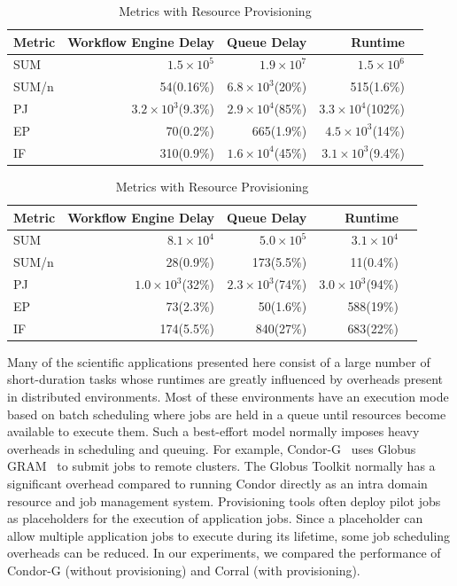 \begin{table}[htb]
	\footnotesize
	\centering
	\begin{tabular}{l|rrrr}
Metric & Workflow Engine Delay  &Queue Delay& Runtime\\
		\hline
		SUM & $1.5\times 10^5$ & $1.9\times 10^7$ &  $1.5\times 10^6$ \\
		SUM/n & 54(0.16\%) & $6.8\times 10^3$(20\%)& 515(1.6\%) \\
		PJ & $3.2\times 10^3$(9.3\%) & $2.9\times 10^4$(85\%) & $3.3\times 10^4$(102\%) \\
		EP & 70(0.2\%) & 665(1.9\%) & $4.5\times 10^3$(14\%) \\
		IF & 310(0.9\%)& $1.6\times 10^4$(45\%) & $3.1\times 10^3$(9.4\%)\\
	\end{tabular}
		\caption{Metrics Without Resource Provisioning}
			\label{tab:profiling_no_provisioning}
	\quad
	\begin{tabular}{l|rrrr}
Metric & Workflow Engine Delay  &Queue Delay& Runtime\\
		\hline
		SUM & $8.1\times 10^4$ & $5.0\times 10^5$ &  $3.1\times 10^4$ \\
		SUM/n & 28(0.9\%) & 173(5.5\%)& 11(0.4\%) \\
		PJ & $1.0\times 10^3$(32\%) & $2.3\times 10^3$(74\%) & $3.0\times 10^3$(94\%) \\
		EP & 73(2.3\%) & 50(1.6\%) & 588(19\%) \\
		IF & 174(5.5\%)& 840(27\%) & 683(22\%)\\
	\end{tabular}
		\caption{Metrics with Resource Provisioning}
	\label{tab:profiling_provisioning}
\end{table}


Many of the scientific applications presented here consist of a large number of short-duration tasks whose runtimes are greatly influenced by overheads present in distributed environments. Most of these environments have an execution mode based on batch scheduling where jobs are held in a queue until resources become available to execute them. Such a best-effort model normally imposes heavy overheads in scheduling and queuing. For example, Condor-G~\cite{Frey2002} uses Globus GRAM~\cite{Foster1997} to submit jobs to remote clusters. The Globus Toolkit normally has a significant overhead compared to running Condor directly as an intra domain resource and job management system. Provisioning tools often deploy pilot jobs as placeholders for the execution of application jobs. Since a placeholder can allow multiple application jobs to execute during its lifetime, some job scheduling overheads can be reduced. In our experiments, we compared the performance of Condor-G (without provisioning) and Corral (with provisioning). 

